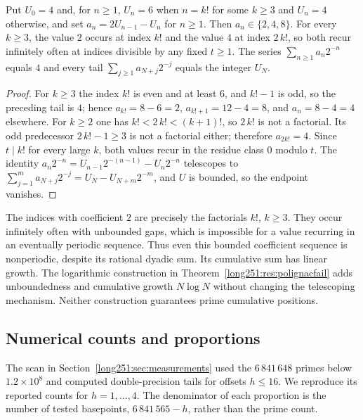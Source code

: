 \begin{proposition}\label{long251:xr:boundedpolignac}
Put $U_0=4$ and, for $n\ge1$, $U_n=6$ when $n=k!$ for some $k\ge3$ and $U_n=4$
otherwise, and set $a_n=2U_{n-1}-U_n$ for $n\ge1$.  Then $a_n\in\{2,4,8\}$.
For every $k\ge3$, the value $2$ occurs at index $k!$ and the value $4$
at index $2\,k!$, so both recur infinitely often at indices divisible by any fixed
$t\ge1$.  The series $\sum_{n\ge1}a_n2^{-n}$ equals $4$ and every tail
$\sum_{j\ge1}a_{N+j}2^{-j}$ equals the integer $U_N$.
\end{proposition}

\begin{proof}
For $k\ge3$ the index $k!$ is even and at least $6$, and $k!-1$ is odd, so the
preceding tail is $4$; hence $a_{k!}=8-6=2$,
$a_{k!+1}=12-4=8$, and $a_n=8-4=4$ elsewhere.  For $k\ge2$ one has
$k!<2\,k!<(k+1)!$, so $2\,k!$ is not a factorial.  Its odd predecessor
$2\,k!-1\ge3$ is not a factorial either; therefore $a_{2k!}=4$.  Since $t\mid k!$ for every
large $k$, both values recur in the residue class $0$ modulo $t$.  The identity
$a_n2^{-n}=U_{n-1}2^{-(n-1)}-U_n2^{-n}$ telescopes to
$\sum_{j=1}^{m}a_{N+j}2^{-j}=U_N-U_{N+m}2^{-m}$, and $U$ is bounded, so the
endpoint vanishes.
\end{proof}

The indices with coefficient $2$ are precisely the factorials $k!$,
$k\ge3$.  They occur infinitely often with unbounded gaps, which is
impossible for a value recurring in an eventually periodic sequence.
Thus even this bounded coefficient sequence is nonperiodic, despite its
rational dyadic sum.  Its cumulative sum has linear growth.
The logarithmic construction in
Theorem~\ref{long251:res:polignacfail} adds unboundedness and cumulative
growth $N\log N$ without changing the telescoping mechanism.  Neither
construction guarantees prime cumulative positions.

\subsection{Numerical counts and proportions}\label{long251:sec:xr-densities}

The scan in Section~\ref{long251:sec:measurements} used the
$6\,841\,648$ primes below $1.2\times10^8$ and computed double-precision
tails for offsets $h\le16$.  We reproduce its reported counts for
$h=1,\ldots,4$.  The denominator of each proportion is the number of
tested basepoints, $6\,841\,565-h$, rather than the prime count.

